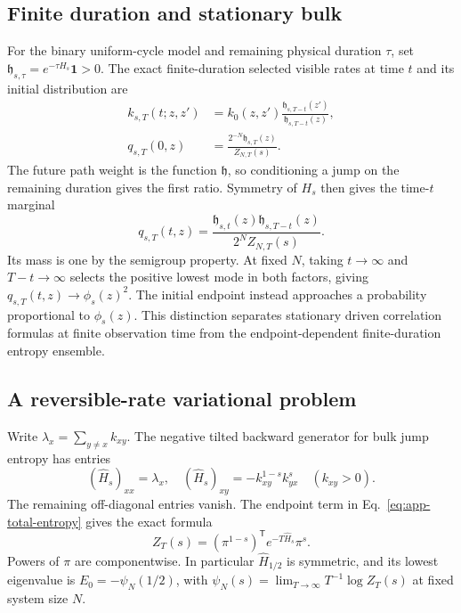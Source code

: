 \documentclass[aps,pre,reprint,amsmath,amssymb,longbibliography,floatfix]{revtex4-2}
\begin{document}
\subsection{Finite duration and stationary bulk}
\label{app:finite-duration-bulk}
For the binary uniform-cycle model and remaining physical duration $\tau$, set
$\mathfrak h_{s,\tau}=e^{-\tau H_s}\mathbf1>0$.
The exact finite-duration selected visible rates at time $t$ and its
initial distribution are
\begin{align}
 k_{s,T}(t;z,z')&=k_0(z,z')
 \frac{\mathfrak h_{s,T-t}(z')}{\mathfrak h_{s,T-t}(z)},\nonumber\\
 q_{s,T}(0,z)&=\frac{2^{-N}\mathfrak h_{s,T}(z)}{Z_{N,T}(s)}.
 \label{eq:finite-duration-rates}
\end{align}
The future path weight is the function $\mathfrak h$, so conditioning a
jump on the remaining duration gives the first ratio. Symmetry of $H_s$
then gives the time-$t$ marginal
\begin{equation}
 q_{s,T}(t,z)=\frac{\mathfrak h_{s,t}(z)
             \mathfrak h_{s,T-t}(z)}{2^N Z_{N,T}(s)}.
 \label{eq:finite-duration-marginal}
\end{equation}
Its mass is one by the semigroup property. At fixed $N$, taking $t\to\infty$ and $T-t\to\infty$ selects the
positive lowest mode in both factors, giving $q_{s,T}(t,z)\to\phi_s(z)^2$. The initial endpoint instead
approaches a probability proportional to $\phi_s(z)$. This distinction
separates stationary driven correlation formulas at finite observation
time from the endpoint-dependent finite-duration entropy ensemble.

\subsection{A reversible-rate variational problem}
\label{app:rate-variational}

Write $\lambda_x=\sum_{y\ne x}k_{xy}$. The negative tilted backward
generator for bulk jump entropy has entries
\begin{equation}
 (\widehat H_s)_{xx}=\lambda_x,\quad
 (\widehat H_s)_{xy}=-k_{xy}^{1-s}k_{yx}^{s}\quad(k_{xy}>0).
 \label{eq:app-tilted-matrix}
\end{equation}
The remaining off-diagonal entries vanish. The endpoint term in
Eq.~\eqref{eq:app-total-entropy} gives the exact formula
\begin{equation}
 Z_T(s)=(\pi^{1-s})^{\mathsf T}e^{-T\widehat H_s}\pi^s.
 \label{eq:app-endpoint-vectors}
\end{equation}
Powers of $\pi$ are componentwise. In particular $\widehat H_{1/2}$ is symmetric,
and its lowest eigenvalue is
$E_0=-\psi_N(1/2)$, with
$\psi_N(s)=\lim_{T\to\infty}T^{-1}\log Z_T(s)$ at fixed system size $N$.
\end{document}
